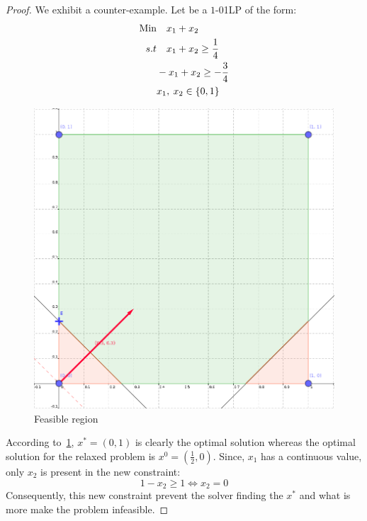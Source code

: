 \begin{proof}
    We exhibit a counter-example. Let be a $1$-01LP of the form:
    \begin{align}
        \text{Min}  & \quad x_1 + x_2\\
        s.t & \quad x_1 + x_ 2 \geq \frac{1}{4}\\
        & -x_1 + x_2 \geq -\frac{3}{4}\\
        & x_1, \: x_2 \in \left\lbrace 0,1 \right\rbrace
    \end{align} 
    \begin{figure}\label{fig:counterExampleL}
        \centering
        \includegraphics[scale=0.4]{figures_tikz/counterExampleL.png}
        \caption{Feasible region}
    \end{figure}
    According to~\ref*{fig:counterExampleL}, $x^* = \left(0,1\right)$ is clearly the optimal solution whereas 
    the optimal solution for the relaxed problem is $x^0 = \left( \frac{1}{2}, 0\right)$.
    Since, $x_1$ has a continuous value, only $x_2$ is present in the new constraint:
    \begin{equation}
        1-x_2 \geq 1 \Leftrightarrow x_2 = 0
    \end{equation}
    Consequently, this new constraint prevent the solver finding the $x^*$ and what is more make the problem infeasible.
\end{proof}
%

